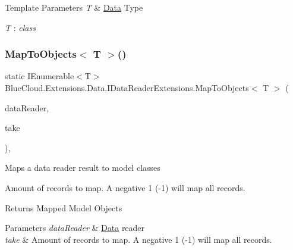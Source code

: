 \begin{DoxyTemplParams}{Template Parameters}
{\em T} & \mbox{\hyperlink{namespace_blue_cloud_1_1_extensions_1_1_data}{Data}} Type\\
\hline
\end{DoxyTemplParams}
\begin{Desc}
\item[Type Constraints]\begin{description}
\item[{\em T} : {\em class}]\end{description}
\end{Desc}
\mbox{\label{class_blue_cloud_1_1_extensions_1_1_data_1_1_i_data_reader_extensions_a4cb93e1c624aa13c212084880c57c243}} 
\subsubsection{\texorpdfstring{Map\+To\+Objects$<$ T $>$()}{MapToObjects< T >()}\hspace{0.1cm}{\footnotesize\ttfamily [2/2]}}
{\footnotesize\ttfamily static I\+Enumerable$<$T$>$ Blue\+Cloud.\+Extensions.\+Data.\+I\+Data\+Reader\+Extensions.\+Map\+To\+Objects$<$ T $>$ (\begin{DoxyParamCaption}\item[{this I\+Data\+Reader}]{data\+Reader,  }\item[{int}]{take }\end{DoxyParamCaption})\hspace{0.3cm}{\ttfamily [inline]}, {\ttfamily [static]}}



Maps a data reader result to model classes 

Amount of records to map. A negative 1 (-\/1) will map all records. 

\begin{DoxyReturn}{Returns}
Mapped Model Objects
\end{DoxyReturn}

\begin{DoxyParams}{Parameters}
{\em data\+Reader} & \mbox{\hyperlink{namespace_blue_cloud_1_1_extensions_1_1_data}{Data}} reader\\
\hline
{\em take} & Amount of records to map. A negative 1 (-\/1) will map all records.\\
\hline
\end{DoxyParams}

